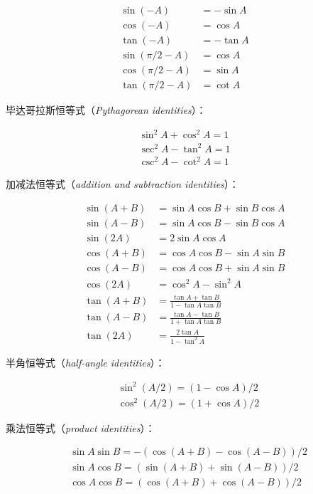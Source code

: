 \documentclass[lang=cn,12pt]{elegantbook}
\begin{document}
$$
  \begin{aligned}
    \sin (-A)        & =-\sin A \\
    \cos (-A)        & =\cos A  \\
    \tan (-A)        & =-\tan A \\
    \sin (\pi / 2-A) & =\cos A  \\
    \cos (\pi / 2-A) & =\sin A  \\
    \tan (\pi / 2-A) & =\cot A
  \end{aligned}
$$

毕达哥拉斯恒等式（\textit{Pythagorean identities}）：

$$
  \begin{array}{r}
    \sin ^{2} A+\cos ^{2} A=1 \\
    \sec ^{2} A-\tan ^{2} A=1 \\
    \csc ^{2} A-\cot ^{2} A=1
  \end{array}
$$

加减法恒等式（\textit{addition and subtraction identities}）：

$$
  \begin{aligned}
    \sin (A+B) & =\sin A \cos B+\sin B \cos A             \\
    \sin (A-B) & =\sin A \cos B-\sin B \cos A             \\
    \sin (2 A) & =2 \sin A \cos A                         \\
    \cos (A+B) & =\cos A \cos B-\sin A \sin B             \\
    \cos (A-B) & =\cos A \cos B+\sin A \sin B             \\
    \cos (2 A) & =\cos ^{2} A-\sin ^{2} A                 \\
    \tan (A+B) & =\frac{\tan A+\tan {B}}{1-\tan A \tan B} \\
    \tan (A-B) & =\frac{\tan A-\tan B}{1+\tan A \tan B}   \\
    \tan (2 A) & =\frac{2 \tan A}{1-\tan^{2}A}
  \end{aligned}
$$

半角恒等式（\textit{half-angle identities}）：

$$
  \begin{aligned}
     & \sin ^{2}(A / 2)=(1-\cos A) / 2 \\
     & \cos ^{2}(A / 2)=(1+\cos A) / 2
  \end{aligned}
$$

乘法恒等式（\textit{product identities}）：

$$
  \begin{aligned}
     & \sin A \sin B=-(\cos (A+B)-\cos (A-B)) / 2 \\
     & \sin A \cos B=(\sin (A+B)+\sin (A-B)) / 2  \\
     & \cos A \cos B=(\cos (A+B)+\cos (A-B)) / 2
  \end{aligned}
$$
\end{document}
